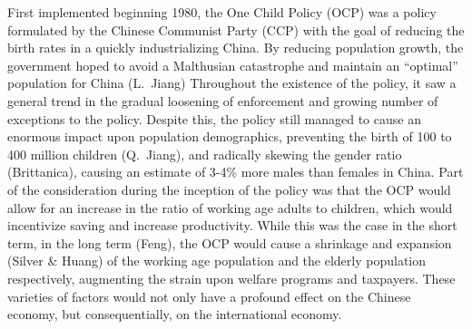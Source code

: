 
First implemented beginning 1980, the One Child Policy (OCP) was a policy formulated by the Chinese Communist Party (CCP) with the goal of reducing the birth rates in a quickly industrializing China. By reducing population growth, the government hoped to avoid a Malthusian catastrophe and maintain an “optimal” population for China (L.\ Jiang) Throughout the existence of the policy, it saw a general trend in the gradual loosening of enforcement and growing number of exceptions to the policy. Despite this, the policy still managed to cause an enormous impact upon population demographics, preventing the birth of 100 to 400 million children (Q.\ Jiang), and radically skewing the gender ratio (Brittanica), causing an estimate of 3-4\% more males than females in China. Part of the consideration during the inception of the policy was that the OCP would allow for an increase in the ratio of working age adults to children, which would incentivize saving and increase productivity. While this was the case in the short term, in the long term (Feng), the OCP would cause a shrinkage and expansion (Silver \& Huang) of the working age population and the elderly population respectively, augmenting the strain upon welfare programs and taxpayers. These varieties of factors would not only have a profound effect on the Chinese economy, but consequentially, on the international economy. 

